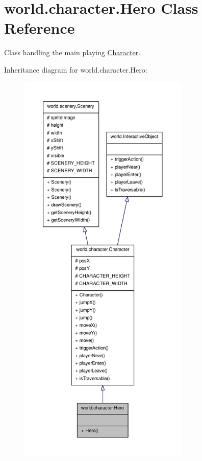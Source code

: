\hypertarget{classworld_1_1character_1_1_hero}{\section{world.\-character.\-Hero Class Reference}
\label{classworld_1_1character_1_1_hero}
}


Class handling the main playing \hyperlink{classworld_1_1character_1_1_character}{Character}.  




Inheritance diagram for world.\-character.\-Hero\-:\nopagebreak
\begin{figure}[H]
\begin{center}
\leavevmode
\includegraphics[height=550pt]{classworld_1_1character_1_1_hero__inherit__graph}
\end{center}
\end{figure}


